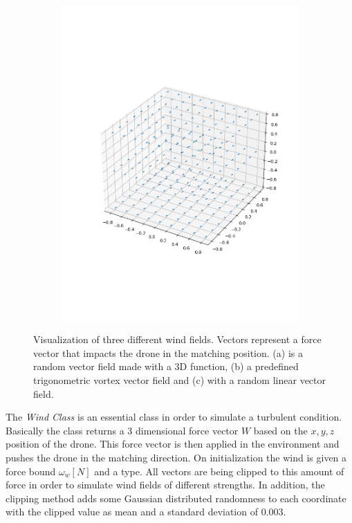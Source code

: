 \begin{figure}
\begin{subfigure}{0.32\linewidth}
		\includegraphics[width=\linewidth]{figures/wind3.png}
		\caption{}
		\label{fig:wind0}
	\end{subfigure}
	\caption{Visualization of three different wind fields. Vectors represent a force vector that impacts the drone in the matching position. (a)  is a random vector field made with a 3D function, (b) a predefined trigonometric vortex vector field and (c) with a random linear vector field.}
\end{figure}
The \emph{Wind Class} is an essential class in order to simulate a turbulent condition. Basically the class returns a 3 dimensional force vector $W$ based on the $x,y,z$ position of the drone. This force vector is then applied in the environment and pushes the drone in the matching direction. On initialization the wind is given a force bound $\omega_w [N]$ and a type. All vectors are being clipped to this amount of force in order to simulate wind fields of different strengths. In addition, the clipping method adds some Gaussian distributed randomness to each coordinate with the clipped value as mean and a standard deviation of $0.003$. \\
